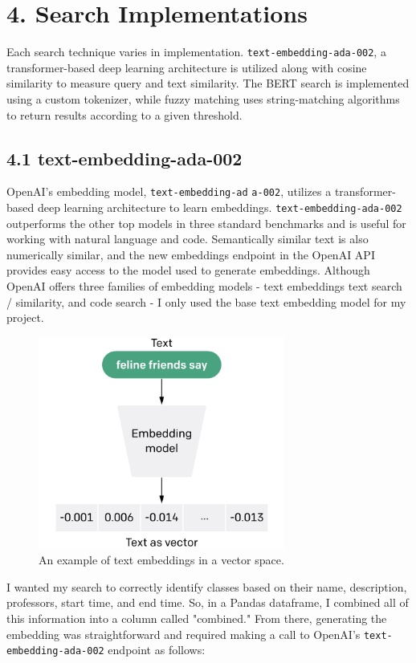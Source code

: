 \documentclass[
	a4paper, %
	10pt, %
	unnumberedsections, %
	twoside, %
]{LTJournalArticle}
\begin{document}
\section{4. Search Implementations}

Each search technique varies in implementation. \texttt{text-embedding-ada-002}, a transformer-based deep learning architecture is utilized along with cosine similarity to measure query and text similarity. The BERT search is implemented using a custom tokenizer, while fuzzy matching uses string-matching algorithms to return results according to a given threshold.

\subsection{4.1 text-embedding-ada-002}

OpenAI's embedding model, \texttt{text-embedding-ad} 
\texttt{a-002}, utilizes a transformer-based deep learning architecture to learn  embeddings. \texttt{text-embedding-ada-002} outperforms the other top models in three standard benchmarks and is useful for working with natural language and code. Semantically similar text is also numerically similar, and the new embeddings endpoint in the OpenAI API provides easy access to the model used to generate embeddings. Although OpenAI offers three families of embedding models - text embeddings text search / similarity, and code search - I only used the base text embedding model for my project.


\begin{figure}[h]
    \includegraphics[width=8.1cm]{embedding.png}
    \caption{An example of text embeddings in a vector space.}
    \label{fig:embedding}
\end{figure}


I wanted my search to correctly identify classes based on their name, description, professors, start time, and end time. So, in a Pandas dataframe, I combined all of this information into a column called "combined." From there, generating the embedding was straightforward and required making a call to OpenAI's \texttt{text-embedding-ada-002} endpoint as follows: 
\end{document}
